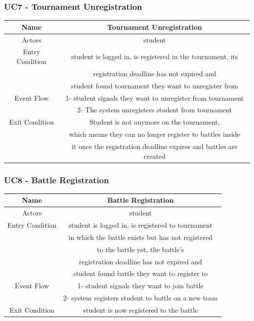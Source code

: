 \documentclass{article}
\begin{document}
\subsubsection*{UC7 - Tournament Unregistration}

\begin{tabular*}{\linewidth}{@{\extracolsep{\fill}} cc }
    \hline
    Name & Tournament Unregistration \\ 
    \hline
    Actors & student\\ 
    \hline
    Entry Condition & student is logged in, is registered in the tournament, its\\
                    & registration deadline has not expired and\\
                    & student found tournament they want to unregister from\\
    \hline
    Event Flow & 1- student signals they want to unregister from tournament\\
               & 2- The system unregisters student from tournament\\
    \hline
    Exit Condition & Student is not anymore on the tournament, \\
                   & which means they can no longer register to battles inside \\
                   & it once the registration deadline expires and battles are created \\
    \hline
\end{tabular*}


\subsubsection*{UC8 - Battle Registration}

\begin{tabular*}{\linewidth}{@{\extracolsep{\fill}} cc }
    \hline
    Name & Battle Registration \\ 
    \hline
    Actors & student\\ 
    \hline
    Entry Condition & student is logged in, is registered to tournament\\
                    & in which the battle exists but has not registered\\
                    & to the battle yet, the battle's\\
                    & registration deadline has not expired and\\
                    & student found battle they want to register to\\
    \hline
    Event Flow & 1- student signals they want to join battle\\
               & 2- system registers student to battle on a new team\\
    \hline
    Exit Condition & student is now registered to the battle\\
    \hline
\end{tabular*}
\end{document}
